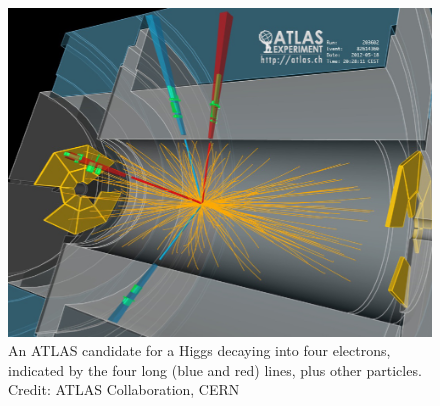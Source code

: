 \documentclass[12pt]{iopart}
\begin{document}
\begin{figure}[htbp]
\centering
\includegraphics[bb=0 0 360 280, width=5in]{Fig17-CE0329H.eps}
\caption{An ATLAS candidate for a Higgs decaying into four electrons, indicated by the four long (blue and red) lines, plus other particles. Credit: ATLAS  Collaboration, CERN \label{Fig17-CE0329H.eps}}
\end{figure}
\end{document}
